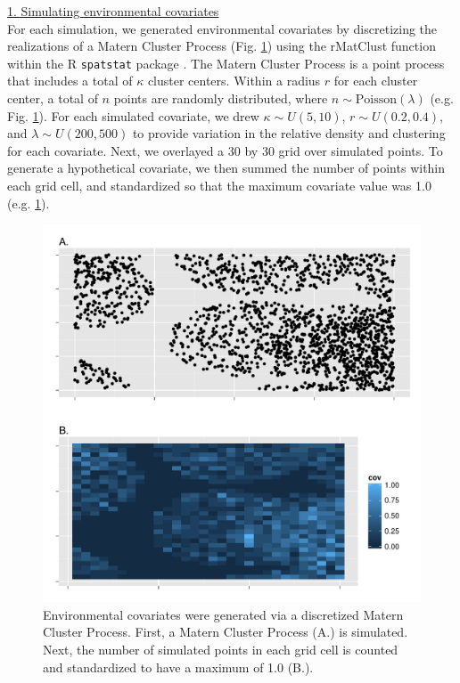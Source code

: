 \documentclass[12pt,fleqn]{article}
\begin{document}
\begin{flushleft}
\underline{1. Simulating environmental covariates} \\
For each simulation, we generated environmental covariates by discretizing the realizations of a Matern Cluster Process (Fig. \ref{fig:Matern}) using the rMatClust function within the R \texttt{spatstat} package \citep{BaddeleyTurner2005}.  The Matern Cluster Process is a point process that includes a total of $\kappa$ cluster centers.  Within a radius $r$ for each cluster center, a total of $n$ points are randomly distributed, where $n \sim \text{Poisson}(\lambda)$ (e.g. Fig. \ref{fig:Matern}).  For each simulated covariate, we drew $\kappa \sim U(5,10)$, $r \sim U(0.2,0.4)$, and $\lambda \sim U(200,500)$ to provide variation in the relative density and clustering for each covariate.  Next, we overlayed a 30 by 30 grid over simulated points.  To generate a hypothetical covariate, we then summed the number of points within each grid cell, and standardized so that the maximum covariate value was 1.0 (e.g. \ref{fig:Matern}).


\begin{figure}[!h]
\begin{center}
\includegraphics[width=6in]{MaternCov.pdf}
\end{center}
\caption{Environmental covariates were generated via a discretized Matern Cluster Process.  First, a Matern Cluster Process (A.) is simulated.  Next, the number of simulated points in each grid cell is counted and standardized to have a maximum of 1.0 (B.).} 
\label{fig:Matern}
\end{figure}


\end{flushleft}
\end{document}
